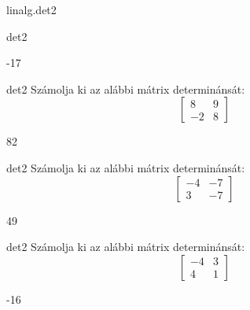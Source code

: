 \documentclass[12pt]{article}
\begin{document}
\begin{quiz}{linalg.det2}
\begin{numerical}{det2}
\item -17
\end{numerical}


\begin{numerical}{det2}
Számolja ki az alábbi mátrix determinánsát:
$$\left[\begin{array}{cc}8& 9\\ -2& 8\end{array}\right]$$

\item 82
\end{numerical}


\begin{numerical}{det2}
Számolja ki az alábbi mátrix determinánsát:
$$\left[\begin{array}{cc}-4& -7\\ 3& -7\end{array}\right]$$

\item 49
\end{numerical}


\begin{numerical}{det2}
Számolja ki az alábbi mátrix determinánsát:
$$\left[\begin{array}{cc}-4& 3\\ 4& 1\end{array}\right]$$

\item -16
\end{numerical}\end{quiz}
\end{document}
